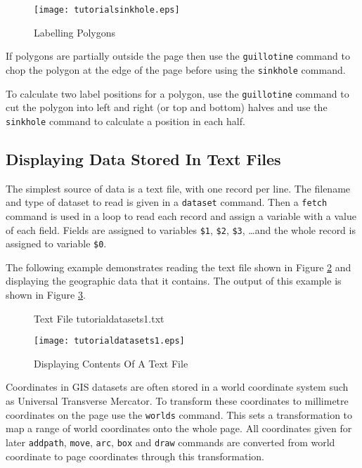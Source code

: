 

\begin{figure}[htb]
\texttt{[image: tutorialsinkhole.eps]}
\caption{Labelling Polygons}
\label{tutorialsinkhole}
\end{figure}

If polygons are partially outside the page then
use the \texttt{guillotine} command to chop the
polygon at the edge of the page before using the \texttt{sinkhole}
command.

To calculate two label positions for a polygon, use the \texttt{guillotine}
command to cut the polygon into left and right (or top and bottom)
halves and use the \texttt{sinkhole} command to calculate a
position in each half.

\subsection{Displaying Data Stored In Text Files}

The simplest source of data is a text file, with one record per line.  The
filename and type of dataset to read is given in a \texttt{dataset} command.
Then a \texttt{fetch} command is used in a loop to read each record
and assign a variable with a value of each field.
Fields are assigned to variables
\texttt{\$1}, \texttt{\$2}, \texttt{\$3}, \dots and the whole record is
assigned to variable \texttt{\$0}.

The following example demonstrates reading the text file shown in Figure
\ref{tutorialdatasets1txt} and displaying the
geographic data that it contains.  The output of this example is shown in
Figure \ref{tutorialdatasets1}.

\begin{figure}[htb]

\caption{Text File tutorialdatasets1.txt}
\label{tutorialdatasets1txt}
\end{figure}



\begin{figure}[htb]
\texttt{[image: tutorialdatasets1.eps]}
\caption{Displaying Contents Of A Text File}
\label{tutorialdatasets1}
\end{figure}

Coordinates in GIS datasets are often stored
in a world coordinate system such as
Universal Transverse Mercator.  To transform these coordinates to millimetre
coordinates on the page use the \texttt{worlds} command.  This sets a
transformation to map a range of world coordinates onto the whole page.  All
coordinates given for later \texttt{addpath}, \texttt{move}, \texttt{arc},
\texttt{box} and
\texttt{draw} commands are converted from world coordinate to page coordinates
through this transformation.

